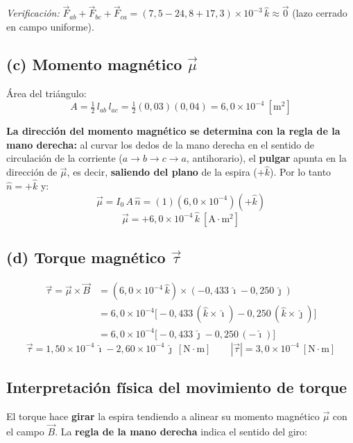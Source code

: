 \documentclass[12pt,letterpaper]{article}
\begin{document}
\noindent\textit{Verificaci\'on:} $\vec{F}_{ab}+\vec{F}_{bc}+\vec{F}_{ca}
= (7{,}5-24{,}8+17{,}3)\times10^{-3}\,\hat{k} \approx \vec{0}$ \;(lazo cerrado en campo uniforme).

\subsection*{(c) Momento magn\'etico $\vec{\mu}$}
\'Area del tri\'angulo:
\[
    A = \tfrac{1}{2}\,l_{ab}\,l_{ac} = \tfrac{1}{2}(0{,}03)(0{,}04) = 6{,}0\times10^{-4}\ [\text{m}^2]
\]

\noindent\textbf{La direcci\'on del momento magn\'etico se determina con la regla de la mano
derecha:} al curvar los dedos de la mano derecha en el sentido de circulaci\'on de la corriente
($a\to b\to c\to a$, antihorario), el \textbf{pulgar} apunta en la direcci\'on de $\vec{\mu}$, es
decir, \textbf{saliendo del plano} de la espira ($+\hat{k}$). Por lo tanto $\hat{n}=+\hat{k}$ y:
\[
    \vec{\mu} = I_0\,A\,\hat{n} = (1)(6{,}0\times10^{-4})(+\hat{k})
\]
\[
    \boxed{\vec{\mu} = +6{,}0\times10^{-4}\,\hat{k}\ [\text{A}\cdot\text{m}^2]}
\]

\subsection*{(d) Torque magn\'etico $\vec{\tau}$}
\begin{align*}
    \vec{\tau} = \vec{\mu}\times\vec{B}
       &= (6{,}0\times10^{-4}\,\hat{k})\times(-0{,}433\,\hat{\imath}-0{,}250\,\hat{\jmath}) \\
       &= 6{,}0\times10^{-4}\big[-0{,}433\,(\hat{k}\times\hat{\imath}) - 0{,}250\,(\hat{k}\times\hat{\jmath})\big] \\
       &= 6{,}0\times10^{-4}\big[-0{,}433\,\hat{\jmath} - 0{,}250\,(-\hat{\imath})\big]
\end{align*}
\[
    \boxed{\vec{\tau} = 1{,}50\times10^{-4}\,\hat{\imath} - 2{,}60\times10^{-4}\,\hat{\jmath}\ [\text{N}\cdot\text{m}]}
    \qquad |\vec{\tau}| = 3{,}0\times10^{-4}\ [\text{N}\cdot\text{m}]
\]

\subsection*{Interpretaci\'on f\'isica del movimiento de torque}
El torque hace \textbf{girar} la espira tendiendo a alinear su momento magn\'etico $\vec{\mu}$
con el campo $\vec{B}$. La \textbf{regla de la mano derecha} indica el sentido del giro:
\end{document}

